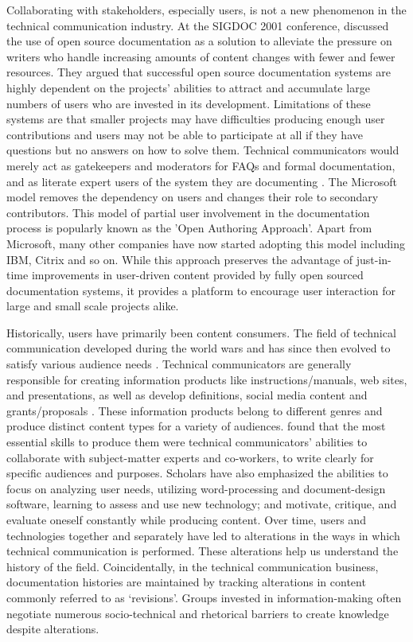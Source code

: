 Collaborating with stakeholders, especially users, is not a new phenomenon in the technical communication industry. At the SIGDOC 2001 conference, \textcite{berglund2001open} discussed the use of open source documentation as a solution to alleviate the pressure on writers who handle increasing amounts of content changes with fewer and fewer resources. They argued that successful open source documentation systems are highly dependent on the projects' abilities to attract and accumulate large numbers of users who are invested in its development. Limitations of these systems are that smaller projects may have difficulties producing enough user contributions and users may not be able to participate at all if they have questions but no answers on how to solve them. Technical communicators would merely act as gatekeepers and moderators for FAQs and formal documentation, and as literate expert users of the system they are documenting \cite{berglund2001open}. The Microsoft model removes the dependency on users and changes their role to secondary contributors. This model of partial user involvement in the documentation process is popularly known as the 'Open Authoring Approach'. Apart from Microsoft, many other companies have now started adopting this model including IBM, Citrix and so on. While this approach preserves the advantage of just-in-time improvements in user-driven content provided by fully open sourced documentation systems, it provides a platform to encourage user interaction for large and small scale projects alike.

Historically, users have primarily been content consumers. The field of technical communication developed during the world wars and has since then evolved to satisfy various audience needs \cite{swarts2018wicked}. Technical communicators are generally responsible for creating information products like instructions/manuals, web sites, and presentations, as well as develop definitions, social media content and grants/proposals \cite{blythe2014professional, kimball2015training, baehr2015complexities, dubinsky2015products}. These information products belong to different genres and produce distinct content types for a variety of audiences. \textcite{brumberger2015evolution} found that the most essential skills to produce them were technical communicators’ abilities to collaborate with subject-matter experts and co-workers, to write clearly for specific audiences and purposes. Scholars have also emphasized the abilities to focus on analyzing user needs, utilizing word-processing and document-design software, learning to assess and use new technology; and motivate, critique, and evaluate oneself constantly \cite{rainey2005curricula} while producing content. Over time, users and technologies together and separately have led to alterations in the ways in which technical communication is performed. These alterations help us understand the history of the field. Coincidentally, in the technical communication business, documentation histories are maintained by tracking alterations in content commonly referred to as ‘revisions’. Groups invested in information-making often negotiate numerous socio-technical and rhetorical barriers \cite{coppola2006guest, doheny1992rhetoric} to create knowledge despite alterations. 

